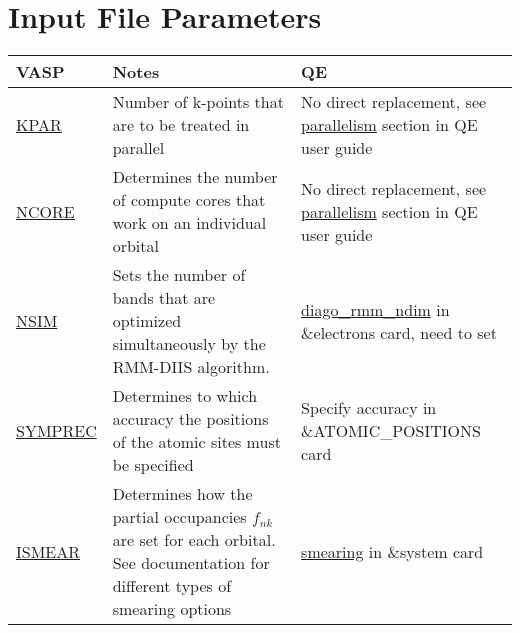 \documentclass[12pt]{article}
\begin{document}
\section*{Input File Parameters}
\begin{center}
\begin{table}[ht]
\begin{tabularx}{\linewidth}{|>{\RaggedRight}p{2.5cm}|x|x|}\hline
 VASP  & Notes & QE \\ \hline
 
 
 \href{https://www.vasp.at/wiki/index.php/KPAR}{KPAR} &
 Number of k-points that are to be treated in parallel &
No direct replacement, see \href{https://www.quantum-espresso.org/Doc/user_guide/node17.html}{parallelism} section in QE user guide \\ \hline

 \href{https://www.vasp.at/wiki/index.php/NCORE}{NCORE} &
 Determines the number of compute cores that work on an individual orbital &
 No direct replacement, see \href{https://www.quantum-espresso.org/Doc/user_guide/node17.html}{parallelism} section in QE user guide \\ \hline

 \href{https://www.vasp.at/wiki/index.php/NSIM}{NSIM} &
 Sets the number of bands that are optimized simultaneously by the RMM-DIIS algorithm. &
 \href{https://www.quantum-espresso.org/Doc/INPUT_PW.html#idm1487}{diago\_rmm\_ndim} in \&electrons card, need to set  \\ \hline

 \href{https://www.vasp.at/wiki/index.php/SYMPREC}{SYMPREC} &
 Determines to which accuracy the positions of the atomic sites must be specified &
 Specify accuracy in \&ATOMIC\_POSITIONS card \\ \hline
 
 \href{https://www.vasp.at/wiki/index.php/ISMEAR}{ISMEAR} &
 Determines how the partial occupancies $f_{nk}$ are set for each orbital. See documentation for different types of smearing options &
 \href{https://www.quantum-espresso.org/Doc/INPUT_PW.html#idm382}{smearing} in \&system card \\ \hline
 

\end{tabularx}
\end{table}
\end{center}
\end{document}
